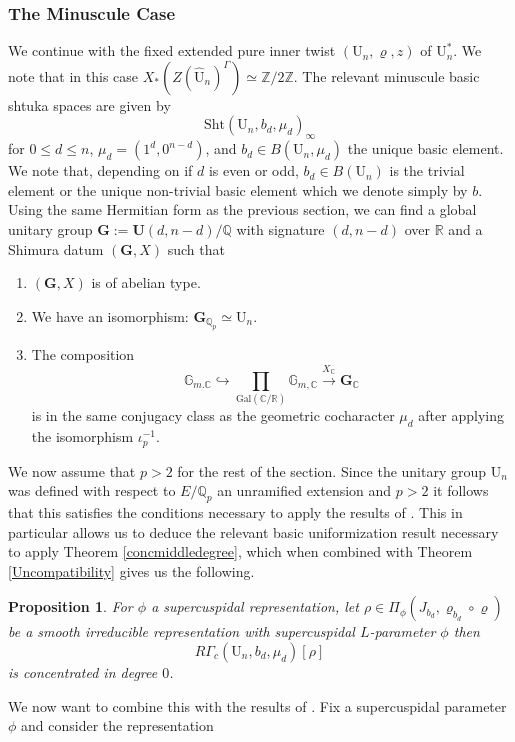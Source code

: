 \documentclass[reqno,11pt]{amsart}
\newtheorem{proposition}[theorem]{Proposition}
\theoremstyle{remark}
\newcommand{\U}{\mathrm{U}}
\newcommand{\Gal}{\mathrm{Gal}}
\newcommand{\Sht}{\mathrm{Sht}}
\begin{document}
\subsubsection{The Minuscule Case}
We continue with the fixed extended pure inner twist $(\U_n, \varrho, z)$ of $\U^*_n$. We note that in this case $X_*(Z(\hat{\U}_{n})^{\Gamma}) \simeq \mathbb{Z}/2\mathbb{Z}$. The relevant minuscule basic shtuka spaces are given by
\[ \Sht(\U_{n},b_{d},\mu_{d})_{\infty} \]
for $0 \leq d \leq n$, $\mu_{d} = (1^{d},0^{n -d})$, and $b_{d} \in B(\U_n,\mu_{d})$ the unique basic element. We note that, depending on if $d$ is even or odd, $b_{d} \in B(\U_n)$ is the trivial element or the unique non-trivial basic element which we denote simply by $b$. Using the same Hermitian form as the previous section, we can find a global unitary group $\mathbf{G} := \mathbf{U}(d,n - d)/\mathbb{Q}$ with signature $(d,n - d)$ over $\mathbb{R}$ and a Shimura datum $(\mathbf{G},X)$ such that
\begin{enumerate}
    \item $(\mathbf{G},X)$ is of abelian type. 
    \item We have an isomorphism: $\mathbf{G}_{\mathbb{Q}_{p}} \simeq \U_n$.
    \item The composition
    \[ \mathbb{G}_{m.\mathbb{C}} \hookrightarrow \prod_{\Gal(\mathbb{C}/\mathbb{R})} \mathbb{G}_{m,\mathbb{C}} \xrightarrow{X_{\mathbb{C}}} \mathbf{G}_{\mathbb{C}} \]
    is in the same conjugacy class as the geometric cocharacter $\mu_{d}$ after applying the isomorphism $\iota^{-1}_p$.
\end{enumerate}
We now assume that $p > 2$ for the rest of the section. Since the unitary group $\U_n$ was defined with respect to $E/\mathbb{Q}_{p}$ an unramified extension and $p > 2$  it follows that this satisfies the conditions necessary to apply the results of \cite{Shen}. This in particular allows us to deduce the relevant basic uniformization result necessary to apply Theorem \ref{concmiddledegree}, which when combined with Theorem \ref{Uncompatibility} gives us the following. 
\begin{proposition}{\label{unmiddledegree}}
For $\phi$ a supercuspidal representation, let $\rho \in \Pi_{\phi}(J_{b_d}, \varrho_{b_d} \circ \varrho)$ be a smooth irreducible representation with supercuspidal $L$-parameter $\phi$ then 
\[ R\Gamma_{c}(\U_{n},b_{d},\mu_{d})[\rho] \]
is concentrated in degree $0$.
\end{proposition}
We now want to combine this with the results of \cite{HKW}. Fix a supercuspidal parameter $\phi$ and consider the representation
\end{document}
